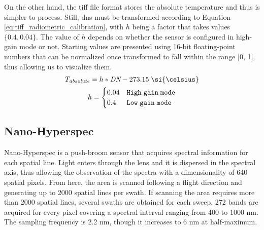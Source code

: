 On the other hand, the \acrshort{tiff} file format stores the absolute temperature and thus is simpler to process. Still, \acrshort{dn}s must be transformed according to Equation \ref{eq:tiff_radiometric_calibration}, with $h$ being a factor that takes values $\{0.4, 0.04\}$. The value of $h$ depends on whether the sensor is configured in high-gain mode or not. Starting values are presented using 16-bit floating-point numbers that can be normalized once transformed to fall within the range [0, 1], thus allowing us to visualize them.
\begin{gather}
    \label{eq:tiff_radiometric_calibration}
    \begin{aligned}
        T_{\textit{absolute}} &= h * \textit{DN} - 273.15 \hspace{1mm} \si{\celsius}\\
    \end{aligned}\\
    h=\begin{cases}
        0.04 &\mathtt{High \hspace{1mm} gain \hspace{1mm} mode}\\
        0.4 &\mathtt{Low \hspace{1mm} gain \hspace{1mm} mode}\\
    \end{cases}
\end{gather}

\subsection{Nano-Hyperspec}

Nano-Hyperspec is a push-broom sensor that acquires spectral information for each spatial line. Light enters through the lens and it is dispersed in the spectral axis, thus allowing the observation of the spectra with a dimensionality of 640 spatial pixels. From here, the area is scanned following a flight direction and generating up to 2000 spatial lines per swath. If scanning the area requires more than 2000 spatial lines, several swaths are obtained for each sweep. 272 bands are acquired for every pixel covering a spectral interval ranging from 400 to 1000 \si{\nano\meter}. The sampling frequency is 2.2 \si{\nano\meter}, though it increases to 6 \si{\nano\meter} at half-maximum.


